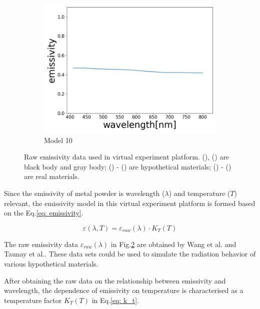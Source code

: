\begin{figure}[htbp]
\begin{subfigure}{0.3\linewidth}
      \includegraphics[width=\linewidth]{figures/emissivity_34.jpg}
      \caption{Model 10}
      \label{fig: emi_34}
    \end{subfigure}
    
    \caption{Raw emissivity data used in virtual experiment platform. (), 
    () are black body and gray body; () - ()
    are hypothetical materials\cite{Wang.2021b}; () - 
    () are real materials\cite{Taunay.2020b}.}
    \label{fig: emi_model}
\end{figure}


Since the emissivity of metal powder is wavelength ($\lambda$) and temperature 
($T$) relevant, the emissivity model in this virtual experiment platform is 
formed based on the Eq.\ref{eq: emissivity}. 


\begin{equation}
  \label{eq: emissivity}
  \varepsilon(\lambda, T) = \varepsilon _{raw}(\lambda) \cdot K_T(T)
\end{equation}


The raw emissivity data $\varepsilon_{raw}(\lambda)$ in Fig.\ref{fig: emi_model}
are obtained by Wang et al.\cite{Wang.2021b} and Taunay et 
al.\cite{Taunay.2020b}. These data sets could be used to simulate the 
radiation behavior of various hypothetical materials.


After obtaining the raw data on the relationship between emissivity 
and wavelength, the dependence of emissivity on temperature is characterised
as a temperature factor $K_T(T)$ in Eq.\ref{eq: k_t}.

